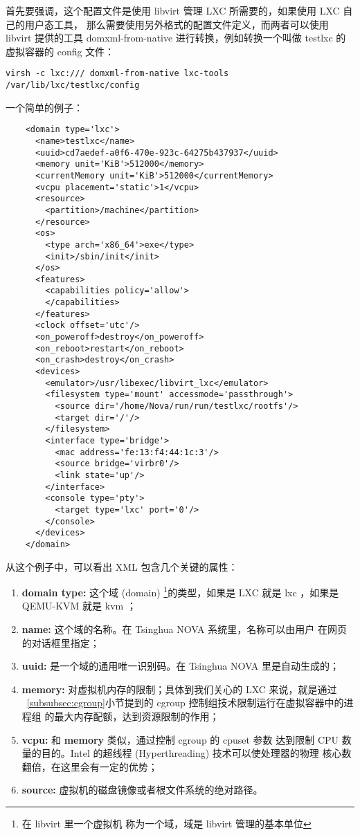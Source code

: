 
首先要强调，这个配置文件是使用 libvirt 管理 LXC 所需要的，如果使用 LXC 自己的用户态工具，
那么需要使用另外格式的配置文件定义，而两者可以使用 libvirt 提供的工具 domxml-from-native
进行转换，例如转换一个叫做 testlxc 的虚拟容器的 config 文件：

\begin{lstlisting}
virsh -c lxc:/// domxml-from-native lxc-tools /var/lib/lxc/testlxc/config
\end{lstlisting}

一个简单的例子：

\begin{lstlisting}
    <domain type='lxc'>
      <name>testlxc</name>
      <uuid>cd7aedef-a0f6-470e-923c-64275b437937</uuid>
      <memory unit='KiB'>512000</memory>
      <currentMemory unit='KiB'>512000</currentMemory>
      <vcpu placement='static'>1</vcpu>
      <resource>
        <partition>/machine</partition>
      </resource>
      <os>
        <type arch='x86_64'>exe</type>
        <init>/sbin/init</init>
      </os>
      <features>
        <capabilities policy='allow'>
        </capabilities>
      </features>
      <clock offset='utc'/>
      <on_poweroff>destroy</on_poweroff>
      <on_reboot>restart</on_reboot>
      <on_crash>destroy</on_crash>
      <devices>
        <emulator>/usr/libexec/libvirt_lxc</emulator>
        <filesystem type='mount' accessmode='passthrough'>
          <source dir='/home/Nova/run/run/testlxc/rootfs'/>
          <target dir='/'/>
        </filesystem>
        <interface type='bridge'>
          <mac address='fe:13:f4:44:1c:3'/>
          <source bridge='virbr0'/>
          <link state='up'/>
        </interface>
        <console type='pty'>
          <target type='lxc' port='0'/>
        </console>
      </devices>
    </domain>
\end{lstlisting}

从这个例子中，可以看出 XML 包含几个关键的属性：

\begin{enumerate}
    \item \textbf{domain type:} 这个域 (domain) \footnote{在 libvirt 里一个虚拟机
    称为一个域，域是 libvirt 管理的基本单位}的类型，如果是 LXC 就是 lxc ，如果是
    QEMU-KVM 就是 kvm ；
    \item \textbf{name:} 这个域的名称。在 Tsinghua NOVA 系统里，名称可以由用户
    在网页的对话框里指定；
    \item \textbf{uuid:} 是一个域的通用唯一识别码。在 Tsinghua NOVA 里是自动生成的；
    \item \textbf{memory:} 对虚拟机内存的限制；具体到我们关心的 LXC 来说，就是通过
    ~\ref{subsubsec:cgroup}小节提到的 cgroup 控制组技术限制运行在虚拟容器中的进程组
    的最大内存配额，达到资源限制的作用；
    \item \textbf{vcpu:} 和 \textbf{memory} 类似，通过控制 cgroup 的 cpuset 参数
    达到限制 CPU 数量的目的。Intel 的超线程 (Hyperthreading) 技术可以使处理器的物理
    核心数翻倍，在这里会有一定的优势；
    \item \textbf{source:} 虚拟机的磁盘镜像或者根文件系统的绝对路径。
\end{enumerate}

